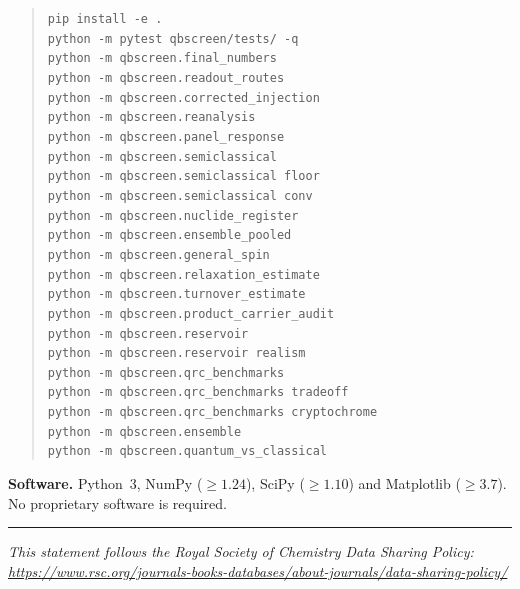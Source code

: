 \documentclass[11pt,a4paper]{article}
\begin{document}
\begin{quote}\small
\texttt{pip install -e .}\\
\texttt{python -m pytest qbscreen/tests/ -q}\\
\texttt{python -m qbscreen.final\_numbers}\\
\texttt{python -m qbscreen.readout\_routes}\\
\texttt{python -m qbscreen.corrected\_injection}\\
\texttt{python -m qbscreen.reanalysis}\\
\texttt{python -m qbscreen.panel\_response}\\
\texttt{python -m qbscreen.semiclassical}\\
\texttt{python -m qbscreen.semiclassical floor}\\
\texttt{python -m qbscreen.semiclassical conv}\\
\texttt{python -m qbscreen.nuclide\_register}\\
\texttt{python -m qbscreen.ensemble\_pooled}\\
\texttt{python -m qbscreen.general\_spin}\\
\texttt{python -m qbscreen.relaxation\_estimate}\\
\texttt{python -m qbscreen.turnover\_estimate}\\
\texttt{python -m qbscreen.product\_carrier\_audit}\\
\texttt{python -m qbscreen.reservoir}\\
\texttt{python -m qbscreen.reservoir realism}\\
\texttt{python -m qbscreen.qrc\_benchmarks}\\
\texttt{python -m qbscreen.qrc\_benchmarks tradeoff}\\
\texttt{python -m qbscreen.qrc\_benchmarks cryptochrome}\\
\texttt{python -m qbscreen.ensemble}\\
\texttt{python -m qbscreen.quantum\_vs\_classical}
\end{quote}

\noindent\textbf{Software.}
Python~3, NumPy ($\ge1.24$), SciPy ($\ge1.10$) and Matplotlib ($\ge3.7$). No
proprietary software is required.

\vspace{1.5em}
\hrule
\vspace{1em}

\noindent\textit{This statement follows the Royal Society of Chemistry Data Sharing
Policy: \url{https://www.rsc.org/journals-books-databases/about-journals/data-sharing-policy/}}
\end{document}
